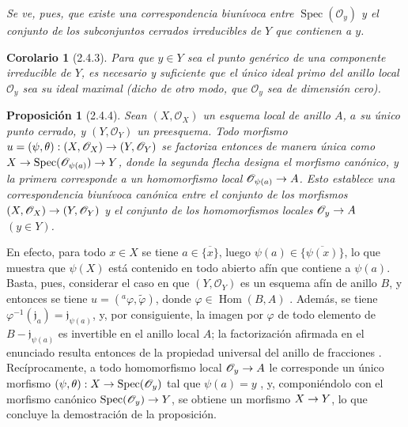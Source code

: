 \documentclass[oneside]{amsart}
\theoremstyle{ega-env-style}
\theoremstyle{ega-thm-env-style}
\newtheorem*{proposition}{Proposición}
\newtheorem*{corollary}{Corolario}
\theoremstyle{ega-defn-env-style}
\renewcommand{\to}{\mathchoice{\longrightarrow}{\rightarrow}{\rightarrow}{\rightarrow}}
\let\EGAOriginalLabel\label
\renewcommand{\label}[1]{\phantomsection\EGAOriginalLabel{#1}}
\begin{document}
\emph{Se ve, pues,  que existe una correspondencia biunívoca entre $\operatorname{Spec}(\mathscr{O}_y)$ y el conjunto de los subconjuntos cerrados irreducibles de $Y$ que contienen a $y$.}

\begin{corollary}[2.4.3]
\label{I.2.4.3}
Para que $y\in Y$ sea el punto genérico de una componente irreducible de $Y$, es necesario y suficiente que el único ideal primo del anillo local $\mathscr{O}_y$ sea su ideal maximal \textup{(dicho de otro modo, que} $\mathscr{O}_y$ \textup{sea} de dimensión cero).
\end{corollary}

\begin{proposition}[2.4.4]
\label{I.2.4.4}
Sean $(X,\mathscr{O}_X)$ un esquema local de anillo $A$, $a$ su único punto cerrado, y $(Y,\mathscr{O}_Y)$ un preesquema.
Todo morfismo $u=(\psi,\theta):(X,\mathscr{O}_X)\to(Y,\mathscr{O}_Y)$ se factoriza entonces de manera única como $X\to\operatorname{Spec}(\mathscr{O}_{\psi(a)})\to Y$, donde la segunda flecha designa el morfismo canónico, y la primera corresponde a un homomorfismo local $\mathscr{O}_{\psi(a)}\to A$.
Esto establece una correspondencia biunívoca canónica entre el conjunto de los morfismos $(X,\mathscr{O}_X)\to(Y,\mathscr{O}_Y)$ y el conjunto de los homomorfismos locales $\mathscr{O}_y\to A$ $(y\in Y)$.
\end{proposition}

En efecto, para todo $x\in X$ se tiene $a\in\overline{\{x\}}$, luego $\psi(a)\in\overline{\{\psi(x)\}}$, lo que muestra que $\psi(X)$ está contenido en todo abierto afín que contiene a $\psi(a)$.
Basta, pues, considerar el caso en que $(Y,\mathscr{O}_Y)$ es un esquema afín de anillo $B$, y entonces se tiene $u=({}^a\varphi,\widetilde{\varphi})$, donde $\varphi\in\operatorname{Hom}(B,A)$ .
Además, se tiene $\varphi^{-1}(\mathfrak{j}_a)=\mathfrak{j}_{\psi(a)}$, y, por consiguiente, la imagen por $\varphi$ de todo elemento de $B-\mathfrak{j}_{\psi(a)}$ es invertible en el anillo local $A$;
la factorización afirmada en el enunciado resulta entonces de la propiedad universal del anillo de fracciones .
Recíprocamente, a todo homomorfismo local $\mathscr{O}_y\to A$ le corresponde un único morfismo $(\psi,\theta):X\to\operatorname{Spec}(\mathscr{O}_y)$ tal que $\psi(a)=y$ , y, componiéndolo con el morfismo canónico $\operatorname{Spec}(\mathscr{O}_y)\to Y$, se obtiene un morfismo $X\to Y$, lo que concluye la demostración de la proposición.
\end{document}
